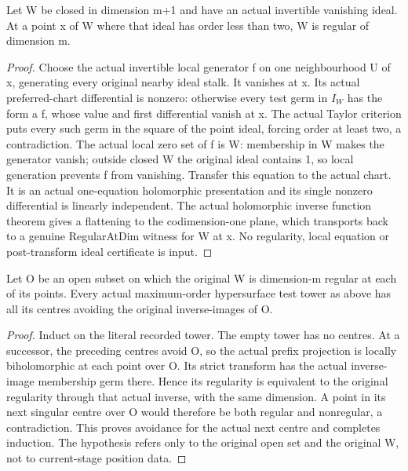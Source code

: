 \begin{lemma}
\label{hir:actual-order-one-regular-hypersurface}
\leanok
Let W be closed in dimension m+1 and have an actual invertible vanishing
ideal. At a point x of W where that ideal has order less than two,
W is regular of dimension m.
\end{lemma}
\begin{proof}
Choose the actual invertible local generator f on one neighbourhood U of x,
generating every original nearby ideal stalk. It vanishes at x. Its
actual preferred-chart differential is nonzero: otherwise every test
germ in $I_W$ has the form a f, whose value and first differential vanish
at x. The actual Taylor criterion puts every such germ in the square
of the point ideal, forcing order at least two, a contradiction.
The actual local zero set of f is W: membership in W makes the generator
vanish; outside closed W the original ideal contains 1, so local generation
prevents f from vanishing. Transfer this equation to the actual chart.
It is an actual one-equation holomorphic presentation and its single
nonzero differential is linearly independent. The actual holomorphic
inverse function theorem gives a flattening to the codimension-one plane,
which transports back to a genuine RegularAtDim witness for W at x.
No regularity, local equation or post-transform ideal certificate is input.
\end{proof}

\begin{lemma}
\label{hir:singular-phases-preserve-regular-open}
\leanok
Let O be an open subset on which the original W is dimension-m regular
at each of its points. Every actual maximum-order hypersurface test tower
as above has all its centres avoiding the original inverse-images of O.
\end{lemma}
\begin{proof}
Induct on the literal recorded tower. The empty tower has no centres.
At a successor, the preceding centres avoid O, so the actual prefix
projection is locally biholomorphic at each point over O. Its strict
transform has the actual inverse-image membership germ there. Hence
its regularity is equivalent to the original regularity through that
actual inverse, with the same dimension. A point in its next singular
centre over O would therefore be both regular and nonregular, a
contradiction. This proves avoidance for the actual next centre and
completes induction. The hypothesis refers only to the original open
set and the original W, not to current-stage position data.
\end{proof}

